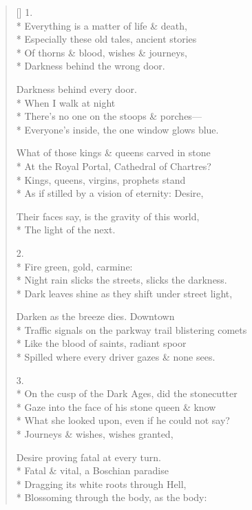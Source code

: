 \label{ch:art_histories}
\settowidth{\versewidth}{Traffic signals on the parkway trail blistering comets}
\begin{verse}[\versewidth]
1.\\*
Everything is a matter of life \& death,\\*
Especially these old tales, ancient stories\\*
Of thorns \& blood, wishes \& journeys,\\*
Darkness behind the wrong door.

Darkness behind every door.\\*
When I walk at night\\*
There's no one on the stoops \& porches---\\*
Everyone's inside, the one window glows blue.

What of those kings \& queens carved in stone\\*
At the Royal Portal, Cathedral of Chartres?\\*
Kings, queens, virgins, prophets stand\\*
As if stilled by a vision of eternity: Desire,

Their faces say, is the gravity of this world,\\*
The light of the next.

2.\\*
\hspace{4\vgap} Fire green, gold, carmine:\\*
Night rain slicks the streets, slicks the darkness.\\*
Dark leaves shine as they shift under street light,

Darken as the breeze dies. Downtown\\*
Traffic signals on the parkway trail blistering comets\\*
Like the blood of saints, radiant spoor \\*
Spilled where every driver gazes \& none sees.

3.\\*
On the cusp of the Dark Ages, did the stonecutter\\*
Gaze into the face of his stone queen \& know\\*
What she looked upon, even if he could not say?\\*
Journeys \& wishes, wishes granted,

Desire proving fatal at every turn.\\*
Fatal \& vital, a Boschian paradise\\*
Dragging its white roots through Hell,\\*
Blossoming through the body, as the body:


\end{verse}
